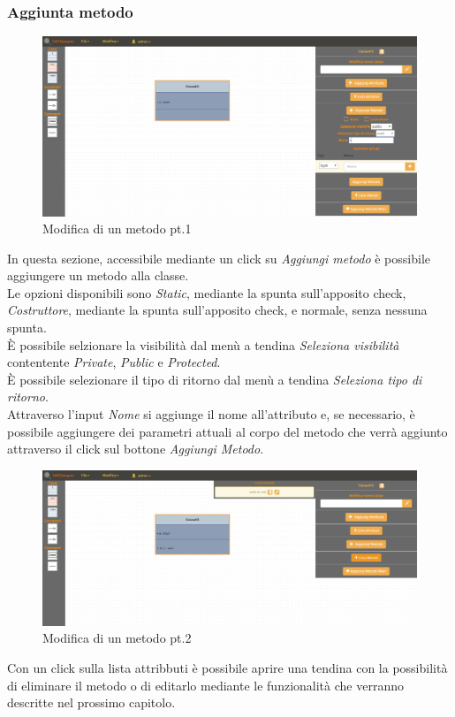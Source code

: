 		\subsubsection{Aggiunta metodo}
			\begin{figure}[h!]
				\centering
					\includegraphics[scale=0.22]{res/img/classe4.png}
				\caption{Modifica di un metodo pt.1}
			\end{figure}
			In questa sezione, accessibile mediante un click su \emph{Aggiungi metodo} è possibile aggiungere un metodo alla classe.\\
			Le opzioni disponibili sono \emph{Static}, mediante la spunta sull'apposito check, \emph{Costruttore}, mediante la spunta sull'apposito check, e normale, senza nessuna spunta.\\
			È possibile selzionare la visibilità dal menù a tendina \emph{Seleziona visibilità} contentente \emph{Private}, \emph{Public} e \emph{Protected}.\\
			È possibile selezionare il tipo di ritorno dal menù a tendina \emph{Seleziona tipo di ritorno}.\\
			Attraverso l'input \emph{Nome} si aggiunge il nome all'attributo e, se necessario, è possibile aggiungere dei parametri attuali al corpo del metodo che verrà aggiunto attraverso il click sul bottone \emph{Aggiungi Metodo}.
			\begin{figure}[h!]
				\centering
					\includegraphics[scale=0.22]{res/img/classe5.png}
				\caption{Modifica di un metodo pt.2}
			\end{figure}
			Con un click sulla lista attribbuti è possibile aprire una tendina con la possibilità di eliminare il metodo o di editarlo mediante le funzionalità che verranno descritte nel prossimo capitolo.
